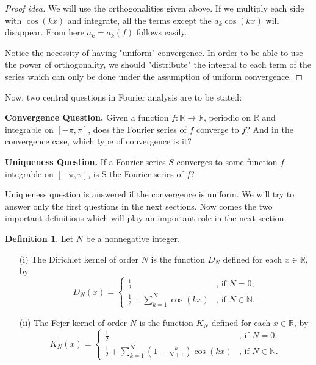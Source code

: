 \documentclass[12pt]{amsart}
\theoremstyle{definition}
\newtheorem{definition}[theorem]{Definition}
\begin{document}


\begin{proof}[Proof idea]
    We will use the orthogonalities given above. If we multiply each side with $\cos(kx)$ and integrate, all the terms except the $a_k \cos(kx)$ will disappear. From here $a_k = a_k(f)$ follows easily. \par
     Notice the necessity of having "uniform" convergence. In order to be able to use the power of orthogonality, we should "distribute" the integral to each term of the series which can only be done under the assumption of uniform convergence.
\end{proof}


    Now, two central questions in Fourier analysis are to be stated:

\textbf{Convergence Question.} Given a function \( f : \mathbb{R} \to \mathbb{R} \), periodic on \( \mathbb{R} \) and integrable on \( [-\pi, \pi] \), does the Fourier series of \( f \) converge to \( f \)? And in the convergence case, which type of convergence is it?


\textbf{Uniqueness Question.} If a Fourier series \( S \) converges to some function \( f \) integrable on \( [-\pi, \pi] \), is S the Fourier series of \(f\)?


Uniqueness question is answered if the convergence is uniform. We will try to answer only the first questions in the next sections. Now comes the two important definitions which will play an important role in the next section.\footnotemark{}




\begin{definition} Let $N$ be a nonnegative integer.
\begin{enumerate}
  \item[(i)] The Dirichlet kernel of order $N$ is the function $D_N$ defined for each $x \in \mathbb{R}$, by
  \[
  D_N(x) = \begin{cases}
            \frac{1}{2} & \text{, if } N = 0, \\
            \frac{1}{2}  + \sum_{k=1}^{N} \cos(kx) & \text{, if } N \in \mathbb{N}.
           \end{cases}
  \]

  \item[(ii)] The Fejer kernel of order $N$ is the function $K_N$ defined for each $x \in \mathbb{R}$, by
  \[
  K_N(x) = \begin{cases}
            \frac{1}{2} & \text{, if } N = 0, \\
            \frac{1}{2} + \sum_{k=1}^{N}\left( 1 - \frac{k}{N + 1} \right)\cos(kx) & \text{, if } N \in \mathbb{N}.
           \end{cases}
  \]
\end{enumerate}
\end{definition}
\end{document}
